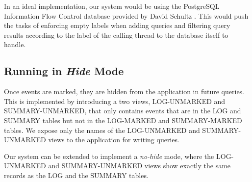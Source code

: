 In an ideal implementation, our system would be using the PostgreSQL Information Flow Control database provided by David Schultz \cite{das}. This would push the tasks of enforcing empty labels when adding queries and filtering query results according to the label of the calling thread to the database itself to handle.

\subsection{Running in \emph{Hide} Mode}

Once events are marked, they are hidden from the application in future queries. This is implemented by introducing a two views, LOG-UNMARKED and SUMMARY-UNMARKED, that only contains events that are in the LOG and SUMMARY tables but not in the LOG-MARKED and SUMMARY-MARKED tables. We expose only the names of the LOG-UNMARKED and SUMMARY-UNMARKED views to the application for writing queries.

Our system can be extended to implement a \emph{no-hide} mode, where the LOG-UNMARKED and SUMMARY-UNMARKED views show exactly the same records as the LOG and the SUMMARY tables.

